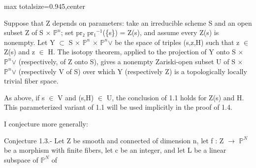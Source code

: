 \documentclass[10pt,a4paper]{article}
\begin{document}
\begin{adjustbox}{max totalsize={\textwidth}{0.945\textheight},center}
\begin{minipage}{\textwidth}
\noindent Suppose that Z depends on parameters: take an irreducible scheme S and an open subset Z of S \ensuremath{×} \ensuremath{ℙ^n}; set pr\ensuremath{₂} pr\ensuremath{₁^{-1}}(\{s\}) = Z(s), and assume every Z(s) is nonempty. Let Y \ensuremath{⊂} S \ensuremath{×} \ensuremath{ℙ^n} \ensuremath{×} \ensuremath{ℙ^n}\ensuremath{∨} be the space of triples (s,z,H) such that z \ensuremath{∈} Z(s) and z \ensuremath{∈} H. The isotopy theorem, applied to the projection of Y onto S \ensuremath{×} \ensuremath{ℙ^n}\ensuremath{∨} (respectively, of Z onto S), gives a nonempty Zariski-open subset U of S \ensuremath{×} \ensuremath{ℙ^n}\ensuremath{∨} (respectively V of S) over which Y (respectively Z) is a topologically locally trivial fiber space.\par\smallskip
\noindent As above, if s \ensuremath{∈} V and (s,H) \ensuremath{∈} U, the conclusion of 1.1 holds for Z(s) and H. This parameterized variant of 1.1 will be used implicitly in the proof of 1.4.\par\smallskip
\noindent I conjecture more generally:\par\smallskip
\noindent Conjecture 1.3.- Let Z be smooth and connected of dimension n, let f : Z \ensuremath{→} \ensuremath{ℙ^N} be a morphism with finite fibers, let c be an integer, and let L be a linear subspace of \ensuremath{ℙ^N} of\par\smallskip
\end{minipage}
\end{adjustbox}
\newpage
\end{document}
